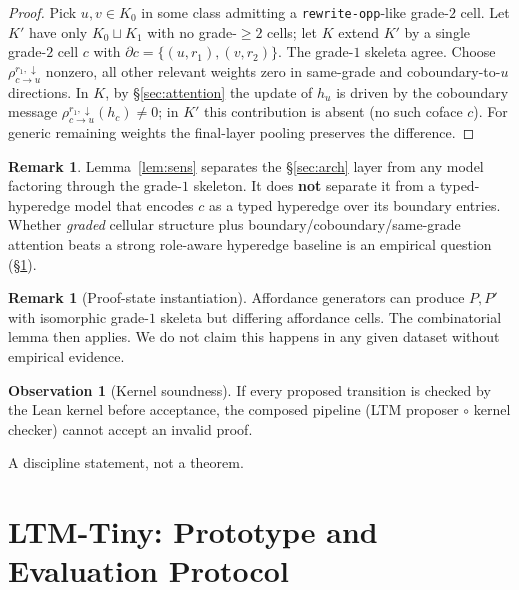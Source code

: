 \documentclass[11pt]{article}
\theoremstyle{definition}
\newtheorem{remark}[definition]{Remark}
\newtheorem{observation}[definition]{Observation}
\theoremstyle{plain}
\newcommand{\role}[1]{\texttt{#1}}
\begin{document}
\begin{proof}
Pick $u, v \in K_0$ in some class admitting a \role{rewrite-opp}-like grade-$2$ cell. Let $K'$ have only $K_0 \sqcup K_1$ with no grade-$\ge 2$ cells; let $K$ extend $K'$ by a single grade-$2$ cell $c$ with $\partial c = \{(u, r_1), (v, r_2)\}$. The grade-$1$ skeleta agree. Choose $\rho^{r_1, \downarrow}_{c \to u}$ nonzero, all other relevant weights zero in same-grade and coboundary-to-$u$ directions. In $K$, by \S\ref{sec:attention} the update of $h_u$ is driven by the coboundary message $\rho^{r_1, \downarrow}_{c \to u}(h_c) \neq 0$; in $K'$ this contribution is absent (no such coface $c$). For generic remaining weights the final-layer pooling preserves the difference.
\end{proof}

\begin{remark}\label{rem:hyperedge}
Lemma~\ref{lem:sens} separates the \S\ref{sec:arch} layer from any model factoring through the grade-$1$ skeleton. It does \textbf{not} separate it from a typed-hyperedge model that encodes $c$ as a typed hyperedge over its boundary entries. Whether \emph{graded} cellular structure plus boundary/coboundary/same-grade attention beats a strong role-aware hyperedge baseline is an empirical question (\S\ref{sec:experiments}).
\end{remark}

\begin{remark}[Proof-state instantiation]\label{rem:instantiation}
Affordance generators can produce $P, P'$ with isomorphic grade-$1$ skeleta but differing affordance cells. The combinatorial lemma then applies. We do not claim this happens in any given dataset without empirical evidence.
\end{remark}

\begin{observation}[Kernel soundness]\label{obs:kernel}
If every proposed transition is checked by the Lean kernel before acceptance, the composed pipeline (LTM proposer $\circ$ kernel checker) cannot accept an invalid proof.
\end{observation}

A discipline statement, not a theorem.

\section{LTM-Tiny: Prototype and Evaluation Protocol}\label{sec:experiments}
\end{document}

